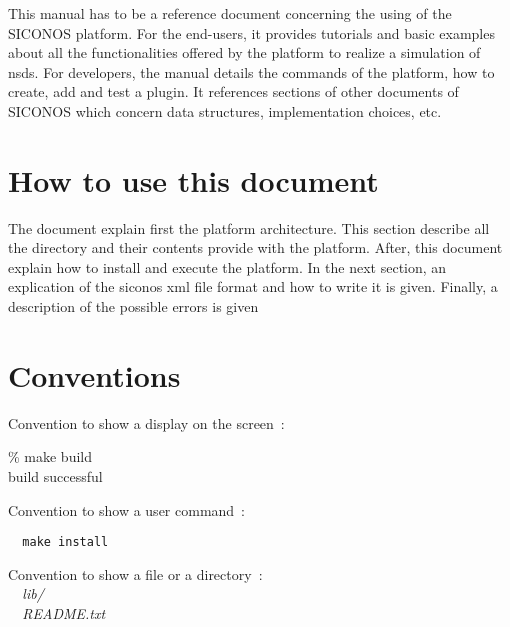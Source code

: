 This manual has to be a reference document concerning the using of the \ac{SICONOS} platform. For the end-users, it provides tutorials and basic examples about all the functionalities offered by the platform to realize a simulation of \ac{nsds}. For developers, the manual details the commands of the platform, how to create, add and test a plugin. It references sections of other documents of \ac{SICONOS} which concern data structures, implementation choices, etc.


\section{How to use this document}
The document explain first the platform architecture. This section describe all the directory and their contents provide with the platform.
After, this document explain how to install and execute the platform.
In the next section, an explication of the \ac{siconos} \ac{xml} file format and how to write it is given.
Finally, a description of the possible errors is given 


\section{Conventions}
Convention to show a display on the screen~: \\

\begin{minipage}{\textwidth}
\small{\textsf{\% make build}}\\
\small{\textsf{build successful} } \\
\end{minipage}
Convention to show a user command~: 
\begin{verbatim}
  make install
\end{verbatim}
Convention to show a file or a directory~: \\
\verb+  +\textit{lib/}\\
\verb+  +\textit{README.txt}



